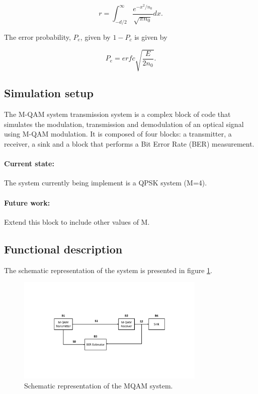 \begin{equation}
r=\int_{-d/2}^{\infty}\frac{e^{-x^2/n_0}}{\sqrt{\pi n_0}} dx.
\end{equation}

The error probability, $P_e$, given by $1-P_c$ is given by

\begin{equation}
P_e=erfc \sqrt{\frac{E}{2 n_0}}.
\end{equation}

\subsection{Simulation setup}

The M-QAM system transmission system is a complex block of code that simulates the modulation, transmission and
demodulation of an optical signal using M-QAM modulation.
It is composed of four blocks: a transmitter, a receiver, a sink and a block that performs a Bit Error Rate (BER) measurement.

\paragraph{Current state:} The system currently being implement is a QPSK system (M=4).

\paragraph{Future work:} Extend this block to include other values of M.

\subsection{Functional description}

The schematic representation of the
system is presented in figure \ref{MQAM_system_block_diagram}.

\begin{figure}
	\centering
	\includegraphics[width=0.8\textwidth]{./figures/MQAM_system_block_diagram}
	\caption{Schematic representation of the MQAM system.}\label{MQAM_system_block_diagram}
\end{figure}


